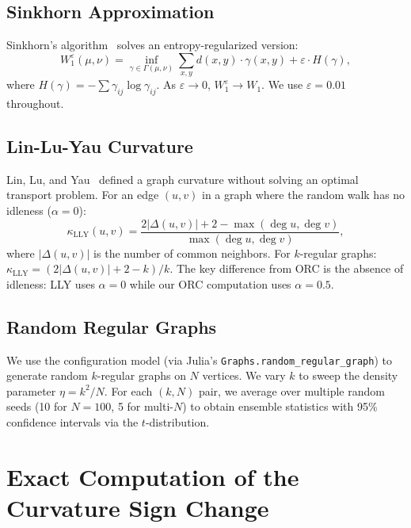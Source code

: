 \documentclass[12pt]{article}
\newcommand{\Wone}{W_1}
\begin{document}
\subsection{Sinkhorn Approximation}

Sinkhorn's algorithm~\cite{Cuturi2013} solves an entropy-regularized version:
\begin{equation}
  \Wone^\varepsilon(\mu, \nu) = \inf_{\gamma \in \Gamma(\mu,\nu)}
  \sum_{x,y} d(x,y)\cdot\gamma(x,y) + \varepsilon\cdot H(\gamma),
  \label{eq:sinkhorn}
\end{equation}
where $H(\gamma) = -\sum \gamma_{ij}\log\gamma_{ij}$. As $\varepsilon \to 0$,
$\Wone^\varepsilon \to \Wone$. We use $\varepsilon = 0.01$ throughout.

\subsection{Lin-Lu-Yau Curvature}

Lin, Lu, and Yau~\cite{Lin2011} defined a graph curvature without solving an optimal
transport problem. For an edge $(u,v)$ in a graph where the random walk has no idleness
($\alpha = 0$):
\begin{equation}
  \kappa_{\mathrm{LLY}}(u,v) = \frac{2|\Delta(u,v)| + 2 - \max(\deg u,\deg v)}
  {\max(\deg u,\deg v)},
  \label{eq:lly}
\end{equation}
where $|\Delta(u,v)|$ is the number of common neighbors. For $k$-regular graphs:
$\kappa_{\mathrm{LLY}} = (2|\Delta(u,v)| + 2 - k)/k$. The key difference from ORC is the
absence of idleness: LLY uses $\alpha = 0$ while our ORC computation uses $\alpha = 0.5$.

\subsection{Random Regular Graphs}

We use the configuration model (via Julia's \texttt{Graphs.random\_regular\_graph}) to
generate random $k$-regular graphs on $N$ vertices. We vary $k$ to sweep the density
parameter $\eta = k^2/N$. For each $(k, N)$ pair, we average over multiple random seeds
(10 for $N = 100$, 5 for multi-$N$) to obtain ensemble statistics with 95\% confidence
intervals via the $t$-distribution.

\section{Exact Computation of the Curvature Sign Change}
\label{sec:results}
\end{document}
